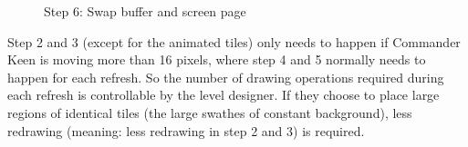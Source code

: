 \documentclass[book.tex]{subfiles}
\begin{document}
\pagebreak

\begin{figure}[H]
\centering
 \caption{Step 6: Swap buffer and screen page}
 \label{fig:kc1_3_update_final}
\end{figure}

Step 2 and 3 (except for the animated tiles) only needs to happen if Commander Keen is moving more than 16 pixels, where step 4 and 5 normally needs to happen for each refresh.
So the number of drawing operations required during each refresh is controllable by the level designer. If they choose to place large regions of identical tiles (the large swathes of constant background), less redrawing (meaning: less redrawing in step 2 and 3) is required.

\pagebreak
\end{document}
